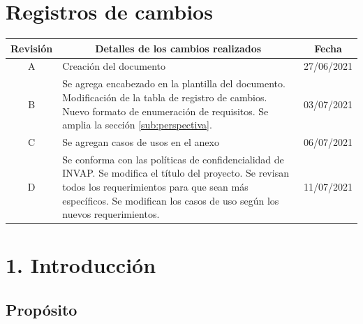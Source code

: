 \documentclass[
11pt, %
codirector, %
]{charter}
\begin{document}
\maketitle
\thispagestyle{empty}
\pagebreak


\thispagestyle{empty}
{\setlength{\parskip}{0pt}
\tableofcontents{}
}
\pagebreak


\section*{Registros de cambios}
\label{sec:registro}

\begin{table}[ht]
\label{tab:registro}
\centering
\begin{tabularx}{\linewidth}{@{}|c|X|c|@{}}
\hline
\rowcolor[HTML]{C0C0C0} 
Revisión & \multicolumn{1}{c|}{\cellcolor[HTML]{C0C0C0}Detalles de los cambios realizados} & Fecha      \\ \hline
A & Creación del documento & 27/06/2021 \\ \hline
B & Se agrega encabezado en la plantilla del documento. \newline
	Modificación de la tabla de registro de cambios. \newline
	Nuevo formato de enumeración de requisitos.\newline
	Se amplia la sección \ref{sub:perspectiva}. & 03/07/2021 \\ \hline
C & Se agregan casos de usos en el anexo & 06/07/2021 \\ \hline
D & Se conforma con las políticas de confidencialidad de INVAP. \newline
    Se modifica el título del proyecto. \newline
    Se revisan todos los requerimientos para que sean más específicos. \newline
    Se modifican los casos de uso según los nuevos requerimientos. & 11/07/2021 \\ \hline
\end{tabularx}
\end{table}

\pagebreak

\section{1. Introducción}
\label{sec:introduccion}

\subsection{Propósito}
\label{sub:proposito}
\end{document}

